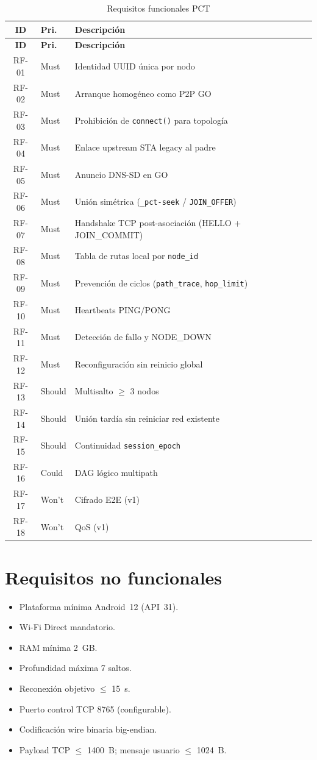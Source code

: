 \begin{longtable}{@{}clp{7cm}@{}}
  \caption{Requisitos funcionales PCT}
  \label{tab:rf} \\
  \toprule
  \textbf{ID} & \textbf{Pri.} & \textbf{Descripción} \\
  \midrule
  \endfirsthead
  \toprule
  \textbf{ID} & \textbf{Pri.} & \textbf{Descripción} \\
  \midrule
  \endhead
  RF-01 & Must & Identidad UUID única por nodo \\
  RF-02 & Must & Arranque homogéneo como P2P GO \\
  RF-03 & Must & Prohibición de \texttt{connect()} para topología \\
  RF-04 & Must & Enlace upstream STA legacy al padre \\
  RF-05 & Must & Anuncio DNS-SD en GO \\
  RF-06 & Must & Unión simétrica (\texttt{\_pct-seek} / \texttt{JOIN\_OFFER}) \\
  RF-07 & Must & Handshake TCP post-asociación (HELLO + JOIN\_COMMIT) \\
  RF-08 & Must & Tabla de rutas local por \texttt{node\_id} \\
  RF-09 & Must & Prevención de ciclos (\texttt{path\_trace}, \texttt{hop\_limit}) \\
  RF-10 & Must & Heartbeats PING/PONG \\
  RF-11 & Must & Detección de fallo y NODE\_DOWN \\
  RF-12 & Must & Reconfiguración sin reinicio global \\
  RF-13 & Should & Multisalto $\geq$ 3 nodos \\
  RF-14 & Should & Unión tardía sin reiniciar red existente \\
  RF-15 & Should & Continuidad \texttt{session\_epoch} \\
  RF-16 & Could & DAG lógico multipath \\
  RF-17 & Won't & Cifrado E2E (v1) \\
  RF-18 & Won't & QoS (v1) \\
  \bottomrule
\end{longtable}

\section{Requisitos no funcionales}
\label{sec:rnf}

\begin{itemize}
  \item[RNF-01] Plataforma mínima Android~12 (API~31).
  \item[RNF-02] Wi-Fi Direct mandatorio.
  \item[RNF-03] RAM mínima 2~GB.
  \item[RNF-04] Profundidad máxima 7 saltos.
  \item[RNF-05] Reconexión objetivo $\leq$ 15~s.
  \item[RNF-06] Puerto control TCP 8765 (configurable).
  \item[RNF-07] Codificación wire binaria big-endian.
  \item[RNF-08--09] Payload TCP $\leq$ 1400~B; mensaje usuario $\leq$ 1024~B.
\end{itemize}

